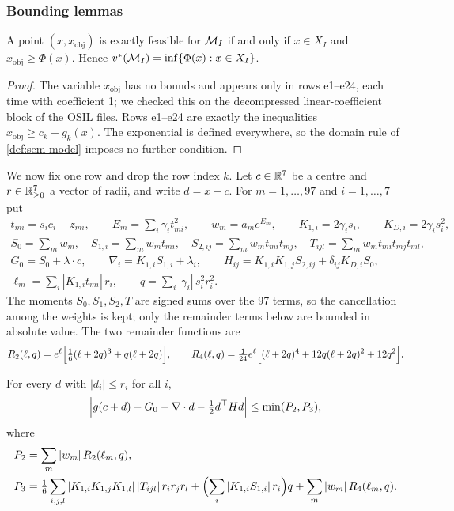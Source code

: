 \subsubsection{Bounding lemmas}\label{app:eg-lemmas}

\begin{lemma}\label{lem:eg-minimax}
A point $(x,x_{\mathrm{obj}})$ is exactly feasible for $\mathcal{M}_I$ if and only if $x\in X_I$ and $x_{\mathrm{obj}}\ge\Phi(x)$.
Hence $v^{*}(\mathcal{M}_I)=\inf\{\Phi(x):x\in X_I\}$.
\end{lemma}

\begin{proof}
The variable $x_{\mathrm{obj}}$ has no bounds and appears only in rows e1--e24, each time with coefficient 1; we checked this on the decompressed linear-coefficient block of the OSIL files.
Rows e1--e24 are exactly the inequalities $x_{\mathrm{obj}}\ge c_k+g_k(x)$.
The exponential is defined everywhere, so the domain rule of \cref{def:sem-model} imposes no further condition.
\end{proof}

We now fix one row and drop the row index $k$.
Let $c\in\mathbb{R}^7$ be a centre and $r\in\mathbb{R}^7_{\ge0}$ a vector of radii, and write $d=x-c$.
For $m=1,\dots,97$ and $i=1,\dots,7$ put
\begin{gather*}
  t_{mi}=s_ic_i-z_{mi},\qquad E_m=\sum_i\gamma_it_{mi}^2,\qquad w_m=a_me^{E_m},\qquad
  K_{1,i}=2\gamma_is_i,\qquad K_{D,i}=2\gamma_is_i^2,\\
  S_0=\sum_m w_m,\quad S_{1,i}=\sum_m w_mt_{mi},\quad S_{2,ij}=\sum_m w_mt_{mi}t_{mj},\quad T_{ijl}=\sum_m w_mt_{mi}t_{mj}t_{ml},\\
  G_0=S_0+\lambda\cdot c,\qquad \nabla_i=K_{1,i}S_{1,i}+\lambda_i,\qquad H_{ij}=K_{1,i}K_{1,j}S_{2,ij}+\delta_{ij}K_{D,i}S_0,\\
  \ell_m=\sum_i|K_{1,i}t_{mi}|\,r_i,\qquad q=\sum_i|\gamma_i|\,s_i^2r_i^2 .
\end{gather*}
The moments $S_0,S_1,S_2,T$ are signed sums over the 97 terms, so the cancellation among the weights is kept; only the remainder terms below are bounded in absolute value.
The two remainder functions are
\begin{equation*}
  R_2(\ell,q)=e^{\ell}\Bigl[\tfrac16(\ell+2q)^3+q(\ell+2q)\Bigr],\qquad
  R_4(\ell,q)=\tfrac1{24}e^{\ell}\Bigl[(\ell+2q)^4+12q(\ell+2q)^2+12q^2\Bigr].
\end{equation*}

\begin{lemma}\label{lem:eg-taylor}
For every $d$ with $|d_i|\le r_i$ for all $i$,
\begin{equation*}
  \Bigl|g(c+d)-G_0-\nabla\cdot d-\tfrac12d^\top Hd\Bigr|\le\min(P_2,P_3),
\end{equation*}
where
\begin{align*}
  P_2&=\sum_m|w_m|\,R_2(\ell_m,q),\\
  P_3&=\tfrac16\sum_{i,j,l}|K_{1,i}K_{1,j}K_{1,l}|\,|T_{ijl}|\,r_ir_jr_l+\Bigl(\sum_i|K_{1,i}S_{1,i}|\,r_i\Bigr)q+\sum_m|w_m|\,R_4(\ell_m,q).
\end{align*}
\end{lemma}

